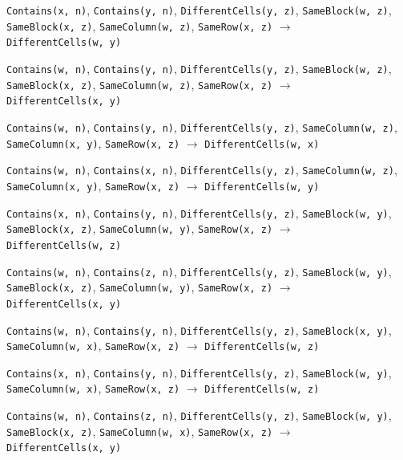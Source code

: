 \documentclass[11pt,a4paper]{article}
\theoremstyle{definition}
\theoremstyle{remark}
\begin{document}
{\begin{enumerate}[label={[\arabic*]},leftmargin=2.6em,itemsep=1pt]
  \item \texttt{Contains(x,~n)}, \allowbreak \texttt{Contains(y,~n)}, \allowbreak \texttt{DifferentCells(y,~z)}, \allowbreak \texttt{SameBlock(w,~z)}, \allowbreak \texttt{SameBlock(x,~z)}, \allowbreak \texttt{SameColumn(w,~z)}, \allowbreak \texttt{SameRow(x,~z)} \;$\to$\; \texttt{DifferentCells(w,~y)}
  \item \texttt{Contains(w,~n)}, \allowbreak \texttt{Contains(y,~n)}, \allowbreak \texttt{DifferentCells(y,~z)}, \allowbreak \texttt{SameBlock(w,~z)}, \allowbreak \texttt{SameBlock(x,~z)}, \allowbreak \texttt{SameColumn(w,~z)}, \allowbreak \texttt{SameRow(x,~z)} \;$\to$\; \texttt{DifferentCells(x,~y)}
  \item \texttt{Contains(w,~n)}, \allowbreak \texttt{Contains(y,~n)}, \allowbreak \texttt{DifferentCells(y,~z)}, \allowbreak \texttt{SameColumn(w,~z)}, \allowbreak \texttt{SameColumn(x,~y)}, \allowbreak \texttt{SameRow(x,~z)} \;$\to$\; \texttt{DifferentCells(w,~x)}
  \item \texttt{Contains(w,~n)}, \allowbreak \texttt{Contains(x,~n)}, \allowbreak \texttt{DifferentCells(y,~z)}, \allowbreak \texttt{SameColumn(w,~z)}, \allowbreak \texttt{SameColumn(x,~y)}, \allowbreak \texttt{SameRow(x,~z)} \;$\to$\; \texttt{DifferentCells(w,~y)}
  \item \texttt{Contains(x,~n)}, \allowbreak \texttt{Contains(y,~n)}, \allowbreak \texttt{DifferentCells(y,~z)}, \allowbreak \texttt{SameBlock(w,~y)}, \allowbreak \texttt{SameBlock(x,~z)}, \allowbreak \texttt{SameColumn(w,~y)}, \allowbreak \texttt{SameRow(x,~z)} \;$\to$\; \texttt{DifferentCells(w,~z)}
  \item \texttt{Contains(w,~n)}, \allowbreak \texttt{Contains(z,~n)}, \allowbreak \texttt{DifferentCells(y,~z)}, \allowbreak \texttt{SameBlock(w,~y)}, \allowbreak \texttt{SameBlock(x,~z)}, \allowbreak \texttt{SameColumn(w,~y)}, \allowbreak \texttt{SameRow(x,~z)} \;$\to$\; \texttt{DifferentCells(x,~y)}
  \item \texttt{Contains(w,~n)}, \allowbreak \texttt{Contains(y,~n)}, \allowbreak \texttt{DifferentCells(y,~z)}, \allowbreak \texttt{SameBlock(x,~y)}, \allowbreak \texttt{SameColumn(w,~x)}, \allowbreak \texttt{SameRow(x,~z)} \;$\to$\; \texttt{DifferentCells(w,~z)}
  \item \texttt{Contains(x,~n)}, \allowbreak \texttt{Contains(y,~n)}, \allowbreak \texttt{DifferentCells(y,~z)}, \allowbreak \texttt{SameBlock(w,~y)}, \allowbreak \texttt{SameColumn(w,~x)}, \allowbreak \texttt{SameRow(x,~z)} \;$\to$\; \texttt{DifferentCells(w,~z)}
  \item \texttt{Contains(w,~n)}, \allowbreak \texttt{Contains(z,~n)}, \allowbreak \texttt{DifferentCells(y,~z)}, \allowbreak \texttt{SameBlock(w,~y)}, \allowbreak \texttt{SameBlock(x,~z)}, \allowbreak \texttt{SameColumn(w,~x)}, \allowbreak \texttt{SameRow(x,~z)} \;$\to$\; \texttt{DifferentCells(x,~y)}

\end{enumerate}}
\end{document}
